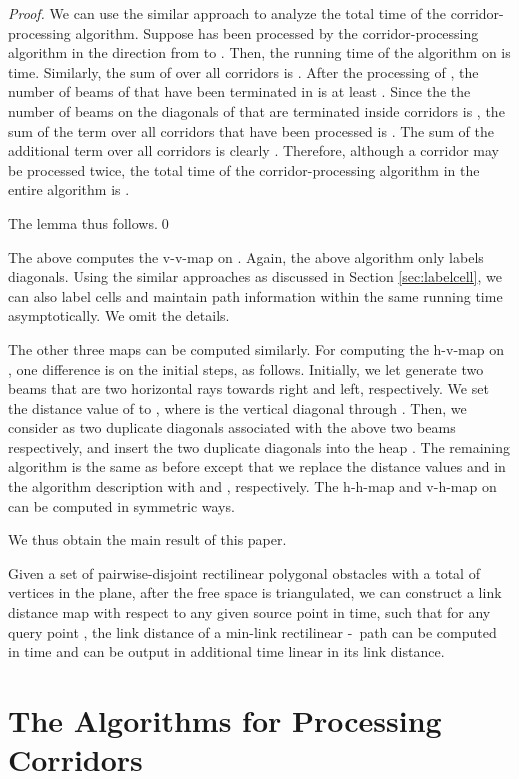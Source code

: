 \documentclass[english,runningheads,11pt]{llncs-revised}
\def\st{-}
\begin{document}
\begin{proof}
We can use the similar approach to analyze the total time of the
corridor-processing algorithm. Suppose  has been processed by
the corridor-processing algorithm in
the direction from  to . Then, the running time of the
algorithm on  is  time. Similarly,
the sum of  over all corridors is .
After the processing of , the number of beams of  that
have been terminated in  is at least . Since the the number of beams on the
diagonals of  that are terminated inside corridors is , the sum of the term
 over all corridors that have been processed is . The
sum of the additional term  over all corridors is clearly .
Therefore, although a corridor may be processed twice, the total time
of the corridor-processing algorithm in the entire algorithm is
.

The lemma thus follows.\qed
\end{proof}


The above computes the v-v-map on . Again, the above algorithm only labels diagonals.
Using the similar approaches as discussed in Section \ref{sec:labelcell},
we can also label cells and maintain path information within the same running time asymptotically. We omit the details.

The other three maps can be computed similarly. For computing the
h-v-map on , one difference is on the initial steps, as follows. Initially, we let  generate two beams that are two horizontal rays towards right and left, respectively. We set the distance value of  to , where  is the vertical diagonal through . Then, we consider  as two duplicate diagonals associated with the above two beams respectively, and insert the two duplicate diagonals into the heap . The remaining algorithm is the same as before except that we replace the distance values  and  in the algorithm description with  and , respectively. The h-h-map and v-h-map on  can be computed in symmetric ways.

We thus obtain the main result of this paper.


\begin{theorem}
Given a set of  pairwise-disjoint rectilinear polygonal obstacles with a total of  vertices in the plane, after the free space is triangulated,
we can construct a link distance map with respect to any given source point  in  time, such that
for any query point , the link distance of a min-link rectilinear \st\ path  can be computed in  time
and  can be output in additional time linear in its link distance.
\end{theorem}


\section{The Algorithms for Processing Corridors}
\label{sec:algocorridor}
\end{document}
